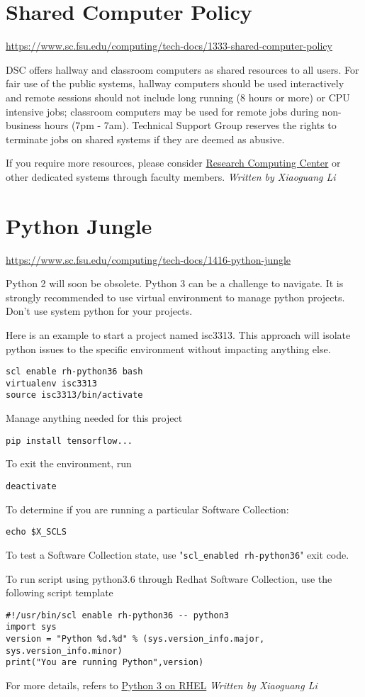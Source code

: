 \documentclass[12pt,a4paper]{article}
\begin{document}
\section{Shared Computer Policy}
\url{https://www.sc.fsu.edu/computing/tech-docs/1333-shared-computer-policy}

DSC offers hallway and classroom computers as shared resources to all users. For fair use of the public systems, hallway computers should be used interactively and remote sessions should not include long running (8 hours or more) or CPU intensive jobs; classroom computers may be used for remote jobs during non-business hours (7pm - 7am). Technical Support Group reserves the rights to terminate jobs on shared systems if they are deemed as abusive.

If you require more resources, please consider \href{https://rcc.fsu.edu/}{Research Computing Center} or other dedicated systems through faculty members.
\hfill \textit{Written by Xiaoguang Li}

\section{Python Jungle}
\url{https://www.sc.fsu.edu/computing/tech-docs/1416-python-jungle}

Python 2 will soon be obsolete. Python 3 can be a challenge to navigate. It is strongly recommended to use virtual environment to manage python projects. Don't use system python for your projects.

Here is an example to start a project named isc3313. This approach will isolate python issues to the specific environment without impacting anything else.
\begin{verbatim}
scl enable rh-python36 bash
virtualenv isc3313
source isc3313/bin/activate
\end{verbatim}
Manage anything needed for this project
\begin{verbatim}
pip install tensorflow...
\end{verbatim}
To exit the environment, run
\begin{verbatim}
deactivate
\end{verbatim}
To determine if you are running a particular Software Collection:
\begin{verbatim}
echo $X_SCLS
\end{verbatim}
To test a Software Collection state, use "\texttt{scl\_enabled rh-python36}" exit code.

To run script using python3.6 through Redhat Software Collection, use the following script template
\begin{verbatim}
#!/usr/bin/scl enable rh-python36 -- python3
import sys
version = "Python %d.%d" % (sys.version_info.major, sys.version_info.minor)
print("You are running Python",version)
\end{verbatim}
For more details, refers to \href{https://developers.redhat.com/products/python/hello-world}{Python 3 on RHEL}
\hfill \textit{Written by Xiaoguang Li}
\end{document}
